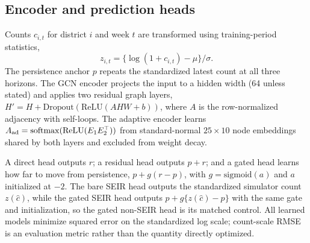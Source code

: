 \documentclass[conference]{IEEEtran}
\begin{document}
\subsection{Encoder and prediction heads}
Counts $c_{i,t}$ for district $i$ and week $t$ are transformed using training-period statistics,
\begin{equation}
z_{i,t}=\{\log(1+c_{i,t})-\mu\}/\sigma.
\label{eq:z}
\end{equation}
The persistence anchor $p$ repeats the standardized latest count at all three horizons.
The GCN encoder projects the input to a hidden width (64 unless stated) and applies two residual graph layers, $H'=H+\mathrm{Dropout}(\mathrm{ReLU}(AHW+b))$, where $A$ is the row-normalized adjacency with self-loops. %
The adaptive encoder learns $A_{\rm ad}=\mathrm{softmax}(\mathrm{ReLU}(E_1E_2^\top))$ from standard-normal $25\times10$ node embeddings shared by both layers and excluded from weight decay. %

A direct head outputs $r$; a residual head outputs $p+r$; and a gated head learns how far to move from persistence, $p+g(r-p)$, with $g=\mathrm{sigmoid}(a)$ and $a$ initialized at $-2$. %
The bare SEIR head outputs the standardized simulator count $z(\hat c)$, while the gated SEIR head outputs $p+g\{z(\hat c)-p\}$ with the same gate and initialization, so the gated non-SEIR head is its matched control.
All learned models minimize squared error on the standardized log scale; count-scale RMSE is an evaluation metric rather than the quantity directly optimized.
\end{document}
